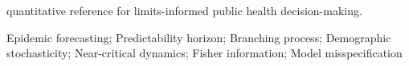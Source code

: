 \documentclass[11pt,a4paper]{article}
\theoremstyle{plain}
\theoremstyle{definition}
\begin{document}
quantitative reference for limits-informed public health decision-making.

\vspace{0.8em}
 Epidemic forecasting; Predictability horizon; Branching process; Demographic stochasticity; Near-critical dynamics; Fisher information; Model misspecification

\vspace{1.5em}


\end{document}
